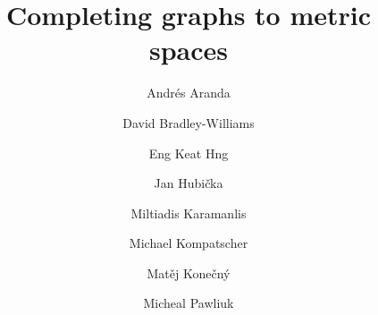\documentclass[11pt]{amsart}
\begin{document}
\title{Completing graphs to metric spaces}

\author[A. Aranda]{Andr\'es Aranda}
\address{Computer Science Institute of Charles University (IUUK)\\ Charles University\\ Prague, Czech Republic}

\author[D. Bradley-Williams]{David Bradley-Williams}
\address{Mathematisches Institut\\ Heinrich-Heine-Universit\"at\\ D\"usseldorf, Germany}

\author[E. K. Hng]{Eng Keat Hng}
\address{Department of Mathematics\\ London School of Economics and Political Science\\ London, UK}

\author[J. Hubi\v cka]{Jan Hubi\v cka}
\address{Department of Applied Mathematics (KAM)\\ Charles University\\ Prague, Czech Republic}

\author[M. Karamanlis]{Miltiadis Karamanlis}
\address{Department of Mathematics\\ National Technical University of Athens\\ Athens, Greece}

\author[M. Kompatscher]{Michael Kompatscher}
\address{Department of Algebra\\ Charles University\\ Prague, Czech Republic}

\author[M. Kone\v cn\'y]{Mat\v ej Kone\v cn\'y}
\address{Department of Applied Mathematics (KAM)\\ Charles University\\ Prague, Czech Republic}

\author[M. Pawliuk]{Micheal Pawliuk}
\address{Department of Mathematics and Statistics\\ University of Calgary\\ Calgary, Canada}
\end{document}
